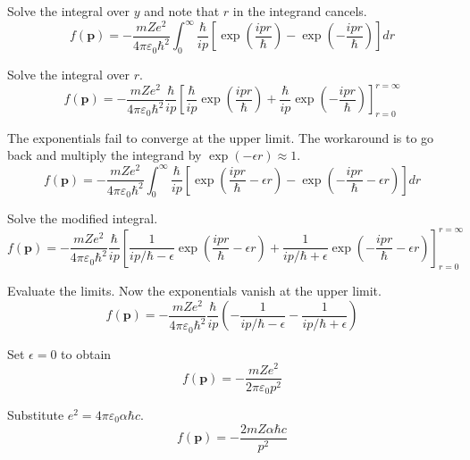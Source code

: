 Solve the integral over $y$ and note that $r$ in the integrand cancels.
\begin{equation*}
f(\mathbf p)=-\frac{mZe^2}{4\pi\varepsilon_0\hbar^2}
\int_0^\infty
\frac{\hbar}{ip}
\left[\exp\left(\frac{ipr}{\hbar}\right)-\exp\left(-\frac{ipr}{\hbar}\right)\right]
dr
\end{equation*}

Solve the integral over $r$.
\begin{equation*}
f(\mathbf p)
=-\frac{mZe^2}{4\pi\varepsilon_0\hbar^2}\frac{\hbar}{ip}
\left[
\frac{\hbar}{ip}
\exp\left(\frac{ipr}{\hbar}\right)
+\frac{\hbar}{ip}
\exp\left(-\frac{ipr}{\hbar}\right)
\right]_{r=0}^{r=\infty}
\end{equation*}

The exponentials fail to converge at the upper limit.
The workaround is to go back and multiply the integrand by $\exp(-\epsilon r)\approx1$.
\begin{equation*}
f(\mathbf p)=-\frac{mZe^2}{4\pi\varepsilon_0\hbar^2}
\int_0^\infty
\frac{\hbar}{ip}
\left[\exp\left(\frac{ipr}{\hbar}-\epsilon r\right)
-\exp\left(-\frac{ipr}{\hbar}-\epsilon r\right)\right]
dr
\end{equation*}

Solve the modified integral.
\begin{equation*}
f(\mathbf p)=-\frac{mZe^2}{4\pi\varepsilon_0\hbar^2}
\frac{\hbar}{ip}
\left[
\frac{1}{ip/\hbar-\epsilon}\exp\left(\frac{ipr}{\hbar}-\epsilon r\right)
+\frac{1}{ip/\hbar+\epsilon}\exp\left(-\frac{ipr}{\hbar}-\epsilon r\right)
\right]_{r=0}^{r=\infty}
\end{equation*}

Evaluate the limits. Now the exponentials vanish at the upper limit.
\begin{equation*}
f(\mathbf p)=-\frac{mZe^2}{4\pi\varepsilon_0\hbar^2}
\frac{\hbar}{ip}
\left(-\frac{1}{ip/\hbar-\epsilon}-\frac{1}{ip/\hbar+\epsilon}\right)
\tag{1}
\end{equation*}

Set $\epsilon=0$ to obtain
\begin{equation*}
f(\mathbf p)=-\frac{mZe^2}{2\pi\varepsilon_0p^2}
\end{equation*}

Substitute $e^2=4\pi\varepsilon_0\alpha\hbar c$.
\begin{equation*}
f(\mathbf p)=-\frac{2mZ\alpha\hbar c}{p^2}
\end{equation*}

